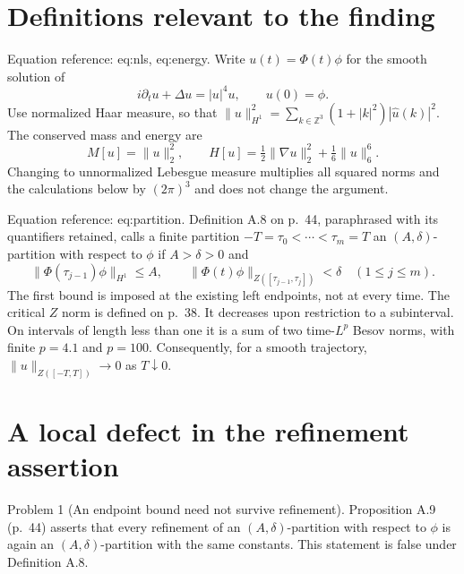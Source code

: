 \documentclass[10pt]{article}
\begin{document}
\section*{Definitions relevant to the finding}
Equation reference: eq:nls, eq:energy. Write \(u(t)=\Phi(t)\phi\) for the smooth solution of \[
 i\partial_tu+\Delta u=|u|^4u,\qquad u(0)=\phi.\] Use normalized Haar measure, so that \(\|u\|_{H^1}^2=\sum_{k\in\mathbb Z^3}(1+|k|^2)|\widehat u(k)|^2\). The conserved mass and energy are \[
 M[u]=\|u\|_2^2,\qquad
 H[u]=\tfrac12\|\nabla u\|_2^2+\tfrac16\|u\|_6^6.\] Changing to unnormalized Lebesgue measure multiplies all squared norms and the calculations below by \((2\pi)^3\) and does not change the argument.\par
Equation reference: eq:partition. Definition A.8 on p. 44, paraphrased with its quantifiers retained, calls a finite partition \(-T=\tau_0<\cdots<\tau_m=T\) an \((A,\delta)\)-partition with respect to \(\phi\) if \(A>\delta>0\) and \[
 \|\Phi(\tau_{j-1})\phi\|_{H^1}\leq A,\qquad
 \|\Phi(t)\phi\|_{Z([\tau_{j-1},\tau_j])}<\delta
 \quad(1\leq j\leq m).\] The first bound is imposed at the existing left endpoints, not at every time. The critical \(Z\) norm is defined on p. 38. It decreases upon restriction to a subinterval. On intervals of length less than one it is a sum of two time-\(L^p\) Besov norms, with finite \(p=4.1\) and \(p=100\). Consequently, for a smooth trajectory, \(\|u\|_{Z([-T,T])}\to0\) as \(T\downarrow0\).\par
\section*{A local defect in the refinement assertion}
Problem 1 (An endpoint bound need not survive refinement).  Proposition A.9 (p. 44) asserts that every refinement of an \((A,\delta)\)-partition with respect to \(\phi\) is again an \((A,\delta)\)-partition with the same constants. This statement is false under Definition A.8.\par
\end{document}
